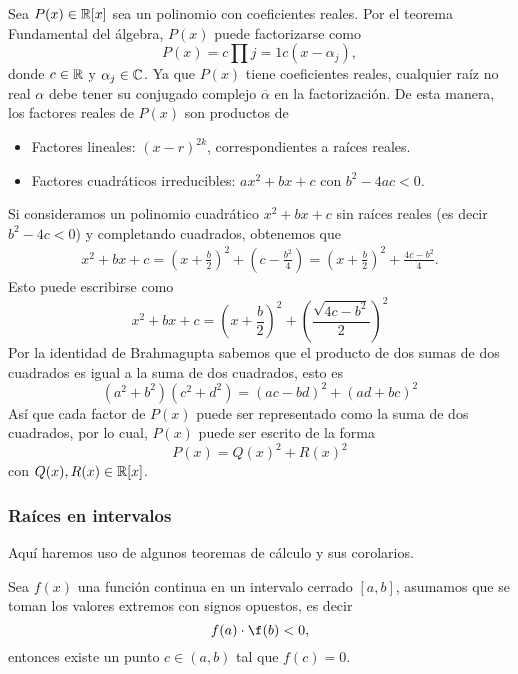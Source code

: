 \begin{solution}
    Sea $P(x) \in \mathbb{R}[x]$ sea un polinomio con coeficientes reales.
    Por el teorema Fundamental del álgebra, $P(x)$ puede factorizarse como
    \[
        P(x) =  c \prod{j = 1}{c} (x - \alpha_j),
    \]
    donde $c \in \mathbb{R}$ y $\alpha_j \in \mathbb{C}$.
    Ya que $P(x)$ tiene coeficientes reales, cualquier raíz no real $\alpha$ debe tener su conjugado complejo $\overline{\alpha}$ en la factorización.
    De esta manera, los factores reales de $P(x)$ son productos de
    \begin{itemize}
        \item Factores lineales: $(x - r)^{2k}$, correspondientes a raíces reales.
        \item Factores cuadráticos irreducibles: $a x^2 + bx + c$ con $b^2 - 4ac < 0$.
    \end{itemize}
    Si consideramos un polinomio cuadrático $x^2 + bx + c$ sin raíces reales (es decir $b^2 - 4c < 0$) y completando cuadrados, obtenemos que
    \begin{align*}
        x^2 + bx + c = \left(x + \frac{b}{2}\right)^2 + \left(c -\frac{b^2}{4}\right) = \left(x + \frac{b}{2}\right)^2 + \frac{4c - b^2}{4}.
    \end{align*}
    Esto puede escribirse como
    \[
        x^2 + bx + c = \left(x + \frac{b}{2}\right)^2 + \left(\frac{\sqrt{4c - b^2}}{2}\right)^2
    \]
    Por la identidad de Brahmagupta sabemos que el producto de dos sumas de dos cuadrados es igual a la suma de dos cuadrados, esto es
    \[
        (a^2 + b^2)(c^2 + d^2) = (ac - bd)^2 + (ad + bc)^2
    \]
    Así que cada factor de $P(x)$ puede ser representado como la suma de dos cuadrados, por lo cual, $P(x)$ puede ser escrito de la forma
    \[
        P(x) = Q(x)^2 + R(x)^2
    \]
    con $Q(x), R(x) \in \mathbb{R}[x]$.
\end{solution}

\subsubsection{Raíces en intervalos}
Aquí haremos uso de algunos teoremas de cálculo y sus corolarios.

\begin{theorem}
    Sea $f(x)$ una función continua en un intervalo cerrado $[a, b]$, asumamos que se toman los valores extremos con signos opuestos, es decir
    \[
        f(a) \cdot \f(b) < 0,
    \]
    entonces existe un punto $c \in (a, b)$ tal que $f(c) = 0$.
\end{theorem}



